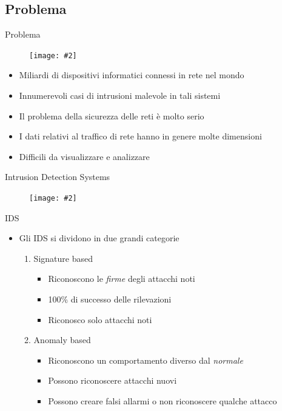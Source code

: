 \documentclass[xcolor={dvipsnames}]{beamer}
\newcommand{\figcen}[2]{
	\begin{figure}
		\begin{center}
			\texttt{[image: \#2]}
		\end{center}
	\end{figure}
}
\begin{document}
	\subsection{Problema}

		\begin{frame}{Problema}
			\figcen{.5\textwidth}{iot}
			\begin{itemize}
				\item Miliardi di dispositivi informatici connessi in rete nel mondo
				\item Innumerevoli casi di intrusioni malevole in tali sistemi
				\item Il problema della sicurezza delle reti è molto serio
				\item I dati relativi al traffico di rete hanno in genere molte dimensioni
				\item Difficili da visualizzare e analizzare
			\end{itemize}
		\end{frame}
		
		\begin{frame}{Intrusion Detection Systems}
			\figcen{.5\textwidth}{guardia}
		\end{frame}

		\begin{frame}{IDS}
			\begin{itemize}
				\item Gli IDS si dividono in due grandi categorie
				\begin{enumerate}
					\item Signature based
					\begin{itemize}
						\item Riconoscono le \emph{firme} degli attacchi noti
						\item 100\% di successo delle rilevazioni
						\item Riconosco solo attacchi noti
					\end{itemize}
					\item Anomaly based
					\begin{itemize}
						\item Riconoscono un comportamento diverso dal \emph{normale}
						\item Possono riconoscere attacchi nuovi
						\item Possono creare falsi allarmi o non riconoscere qualche attacco
					\end{itemize}
				\end{enumerate}
			\end{itemize}
		\end{frame}
\end{document}
